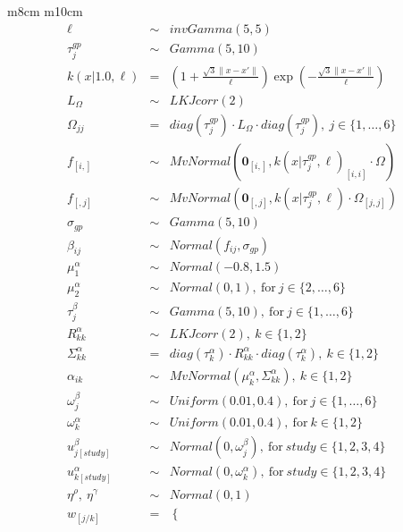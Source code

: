 \documentclass{article}
\begin{document}
\begin{tabular}{ m{8cm} m{10cm}}
\renewcommand{\arraystretch}{1.2}
\[
\begin{array}{rcl}
    \ell& \sim & invGamma(5, 5) \\
    \tau_j^{gp} & \sim & Gamma(5, 10) \\
    k(x | 1.0, \ell) & = & \left( 1 + \frac{\sqrt{3} \|x - x'\|}{\ell} \right) \exp\left(-\frac{\sqrt{3} \|x - x'\|}{\ell}\right) \\
    L_{\Omega} & \sim & LKJcorr(2)  \\
    \Omega_{jj} & = & diag(\tau_j^{gp}) \cdot L_{\Omega} \cdot diag(\tau_j^{gp}),\ j \in \{1, \ldots, 6\}  \\  
    f_{[i,]} & \sim & MvNormal(\mathbf{0}_{[i,]}, k(x | \tau_j^{gp}, \ell)_{[i,i]} \cdot \Omega) \\ 
    f_{[,j]} & \sim & MvNormal(\mathbf{0}_{[,j]}, k(x | \tau_j^{gp}, \ell) \cdot \Omega_{[j,j]}) \\ 
    \sigma_{gp} & \sim & Gamma(5, 10) \\
    \beta_{ij} & \sim & Normal(f_{ij}, \sigma_{gp}) \\
    \mu_{1}^{\alpha} & \sim & Normal(-0.8, 1.5) \\
    \mu_{2}^{\alpha} & \sim & Normal(0, 1),\ \mathrm{for}\ j \in \{2, \ldots, 6\} \\
    \tau_{j}^{\beta} & \sim & Gamma(5, 10),\ \mathrm{for}\ j \in \{1, \ldots, 6\} \\
    R_{kk}^{\alpha} & \sim & LKJcorr(2),\ k \in \{1, 2\}  \\ 
    \Sigma_{kk}^{\alpha} & = & diag(\tau_{k}^{\alpha}) \cdot R_{kk}^{\alpha} \cdot diag(\tau_{k}^{\alpha}),\ k \in \{1, 2\}  \\  
    \alpha_{ik} & \sim & MvNormal(\mu_k^{\alpha}, \Sigma_{kk}^{\alpha}),\ k \in \{1, 2\} \\
    \omega_{j}^{\beta} & \sim & Uniform(0.01, 0.4),\ \mathrm{for}\ j \in \{1, \ldots, 6\} \\
    \omega_{k}^{\alpha} & \sim & Uniform(0.01, 0.4),\ \mathrm{for}\ k \in \{1, 2\} \\
    u_{j[study]}^{\beta} & \sim & Normal(0, \omega_{j}^{\beta}),\ \mathrm{for}\ study \in \{1, 2, 3, 4\} \\
    u_{k[study]}^{\alpha} & \sim & Normal(0, \omega_{k}^{\alpha}),\ \mathrm{for}\ study \in \{1, 2, 3, 4\} \\
    \eta^{\rho},\ \eta^{\gamma} & \sim & Normal(0, 1) \\
    w_{[j/k]} & = & 
    \begin{cases} 

\end{cases}
\end{array}\]
\end{tabular}
\end{document}
